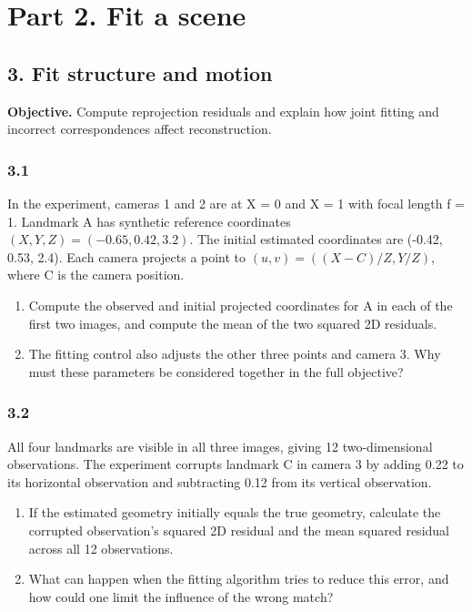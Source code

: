 \documentclass[11pt,a4paper]{article}
\begin{document}
\section*{Part 2. Fit a scene}
\subsection*{3. Fit structure and motion}
\noindent\textbf{Objective.} Compute reprojection residuals and explain how joint fitting and incorrect correspondences affect reconstruction.
\par
\noindent
\begin{minipage}{\linewidth}
\subsubsection*{3.1}
In the experiment, cameras 1 and 2 are at X = 0 and X = 1 with focal length f = 1.
Landmark A has synthetic reference coordinates $(X,Y,Z)=(-0.65,0.42,3.2)$.
The initial estimated coordinates are (-0.42, 0.53, 2.4).
Each camera projects a point to $(u,v)=((X-C)/Z,Y/Z)$, where C is the camera position.
\begin{enumerate}[label=(\alph*),nosep]
\item Compute the observed and initial projected coordinates for A in each of the first two images, and compute the mean of the two squared 2D residuals.
\item The fitting control also adjusts the other three points and camera 3.
Why must these parameters be considered together in the full objective?
\end{enumerate}
\end{minipage}
\par\medskip
\par
\noindent
\begin{minipage}{\linewidth}
\subsubsection*{3.2}
All four landmarks are visible in all three images, giving 12 two-dimensional observations.
The experiment corrupts landmark C in camera 3 by adding 0.22 to its horizontal observation and subtracting 0.12 from its vertical observation.
\begin{enumerate}[label=(\alph*),nosep]
\item If the estimated geometry initially equals the true geometry, calculate the corrupted observation's squared 2D residual and the mean squared residual across all 12 observations.
\item What can happen when the fitting algorithm tries to reduce this error, and how could one limit the influence of the wrong match?
\end{enumerate}
\end{minipage}
\end{document}
